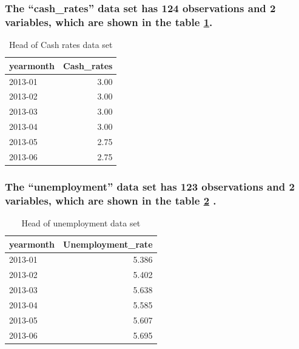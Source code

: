 \documentclass[11pt,a4paper,]{article}
\begin{document}
\hypertarget{the-cash_rates-data-set-has-124-observations-and-2-variables-which-are-shown-in-the-table-reftabtabcash.}{%
\subsubsection{The ``cash\_rates'' data set has 124 observations and 2 variables, which are shown in the table \ref{tab:tabcash}.}\label{the-cash_rates-data-set-has-124-observations-and-2-variables-which-are-shown-in-the-table-reftabtabcash.}}

\begin{table}

\caption{\label{tab:tabcash}Head of Cash rates data set}
\centering
\begin{tabular}[t]{l|r}
\hline
yearmonth & Cash\_rates\\
\hline
2013-01 & 3.00\\
\hline
2013-02 & 3.00\\
\hline
2013-03 & 3.00\\
\hline
2013-04 & 3.00\\
\hline
2013-05 & 2.75\\
\hline
2013-06 & 2.75\\
\hline
\end{tabular}
\end{table}

\hypertarget{the-unemployment-data-set-has-123-observations-and-2-variables-which-are-shown-in-the-table-reftabtabun-.}{%
\subsubsection{The ``unemployment'' data set has 123 observations and 2 variables, which are shown in the table \ref{tab:tabun} .}\label{the-unemployment-data-set-has-123-observations-and-2-variables-which-are-shown-in-the-table-reftabtabun-.}}

\begin{table}

\caption{\label{tab:tabun}Head of unemployment data set}
\centering
\begin{tabular}[t]{l|r}
\hline
yearmonth & Unemployment\_rate\\
\hline
2013-01 & 5.386\\
\hline
2013-02 & 5.402\\
\hline
2013-03 & 5.638\\
\hline
2013-04 & 5.585\\
\hline
2013-05 & 5.607\\
\hline
2013-06 & 5.695\\
\hline
\end{tabular}
\end{table}
\end{document}
